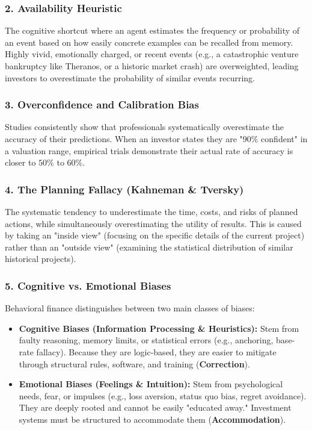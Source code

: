 \documentclass[11pt,a4paper]{article}
\begin{document}
\subsubsection{2. Availability Heuristic}
The cognitive shortcut where an agent estimates the frequency or probability of an event based on how easily concrete examples can be recalled from memory. Highly vivid, emotionally charged, or recent events (e.g., a catastrophic venture bankruptcy like Theranos, or a historic market crash) are overweighted, leading investors to overestimate the probability of similar events recurring.

\subsubsection{3. Overconfidence and Calibration Bias}
Studies consistently show that professionals systematically overestimate the accuracy of their predictions. When an investor states they are "$90\%$ confident" in a valuation range, empirical trials demonstrate their actual rate of accuracy is closer to $50\%$ to $60\%$.

\subsubsection{4. The Planning Fallacy (Kahneman \& Tversky)}
The systematic tendency to underestimate the time, costs, and risks of planned actions, while simultaneously overestimating the utility of results. This is caused by taking an "inside view" (focusing on the specific details of the current project) rather than an "outside view" (examining the statistical distribution of similar historical projects).

\subsubsection{5. Cognitive vs. Emotional Biases}
Behavioral finance distinguishes between two main classes of biases:
\begin{itemize}
    \item \textbf{Cognitive Biases (Information Processing \& Heuristics):} Stem from faulty reasoning, memory limits, or statistical errors (e.g., anchoring, base-rate fallacy). Because they are logic-based, they are easier to mitigate through structural rules, software, and training (\textbf{Correction}).
    \item \textbf{Emotional Biases (Feelings \& Intuition):} Stem from psychological needs, fear, or impulses (e.g., loss aversion, status quo bias, regret avoidance). They are deeply rooted and cannot be easily "educated away." Investment systems must be structured to accommodate them (\textbf{Accommodation}).
\end{itemize}
\end{document}
